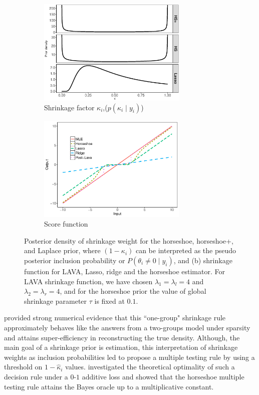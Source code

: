 \documentclass[sts,preprint]{imsart}
\begin{document}
\begin{figure}[!ht]
\begin{subfigure}{0.48\linewidth}
\centering
\includegraphics[height = 2in, width=\textwidth]{prior_diff_kappa}
\caption{\footnotesize{Shrinkage factor $\kappa_i$,($p(\kappa_i \mid y_i)$)}}
\label{fig:priorkappa}
\end{subfigure}
\begin{subfigure}{0.48\linewidth}%
\centering
\includegraphics[height = 2in, width=\columnwidth]{shrinakge_hs_lasso_lava}%
\caption{Score function}%
\label{fig:score}%
\end{subfigure}
\label{fig:score-kappa}
\caption{\footnotesize{Posterior density of shrinkage weight for the horseshoe, horseshoe+, and Laplace
prior, where $(1- \kappa_i)$ can be interpreted as the pseudo posterior inclusion probability or $P(\theta_i \ne 0 \mid y_i)$, and (b) shrinkage function for LAVA, Lasso, ridge and the horseshoe estimator. For
LAVA shrinkage function, we have chosen $\lambda_1 = \lambda_l = 4$ and $\lambda_2 = \lambda_r = 4$, and for the horseshoe prior the value of global shrinkage parameter $\tau$ is fixed at $0.1$.}}
\end{figure}


\citet{carvalho2010horseshoe} provided strong numerical evidence that this
``one-group" shrinkage rule approximately behaves like the answers from a
two-groups model under sparsity and attains super-efficiency in reconstructing
the true density. Although, the main goal of a shrinkage prior is estimation,
this interpretation of shrinkage weights as inclusion probabilities led
\citet{carvalho2010horseshoe} to propose a multiple testing rule by using a
threshold on $1-\hat{\kappa}_i$ values. \citet{datta2013asymptotic}
investigated the theoretical optimality of such a decision rule under a $0$-$1$
additive loss and showed that the horseshoe multiple testing rule attains the
Bayes oracle up to a multiplicative constant. 
\end{document}
